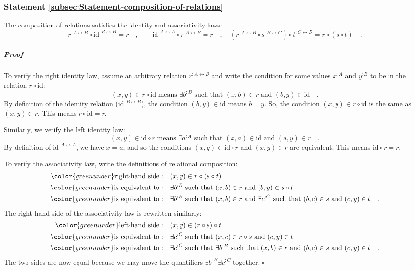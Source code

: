 \subsubsection{Statement \label{subsec:Statement-composition-of-relations}\ref{subsec:Statement-composition-of-relations}}

The composition of relations satisfies the identity and associativity
laws:
\[
r^{:A\leftrightarrow B}\circ\text{id}^{:B\leftrightarrow B}=r\quad,\quad\quad\text{id}^{:A\leftrightarrow A}\circ r^{:A\leftrightarrow B}=r\quad,\quad(r^{:A\leftrightarrow B}\circ s^{:B\leftrightarrow C})\circ t^{:C\leftrightarrow D}=r\circ(s\circ t)\quad.
\]


\subparagraph{Proof}

To verify the right identity law, assume an arbitrary relation $r^{:A\leftrightarrow B}$
and write the condition for some values $x^{:A}$ and $y^{:B}$ to
be in the relation $r\circ\text{id}$:
\[
(x,y)\in r\circ\text{id}\text{ means }\exists b^{:B}\text{ such that }(x,b)\in r\text{ and }(b,y)\in\text{id}\quad.
\]
By definition of the identity relation ($\text{id}^{:B\leftrightarrow B}$),
the condition $(b,y)\in\text{id}$ means $b=y$. So, the condition
$(x,y)\in r\circ\text{id}$ is the same as $(x,y)\in r$. This means
$r\circ\text{id}=r$.

Similarly, we verify the left identity law:
\[
(x,y)\in\text{id}\circ r\text{ means }\exists a^{:A}\text{ such that }(x,a)\in\text{id}\text{ and }(a,y)\in r\quad.
\]
By definition of $\text{id}^{:A\leftrightarrow A}$, we have $x=a$,
and so the conditions $(x,y)\in\text{id}\circ r$ and $(x,y)\in r$
are equivalent. This means $\text{id}\circ r=r$.

To verify the associativity law, write the definitions of relational
composition:
\begin{align*}
{\color{greenunder}\text{right-hand side}:}\quad & (x,y)\in r\circ(s\circ t)\\
{\color{greenunder}\text{is equivalent to}:}\quad & \exists b^{:B}\text{ such that }(x,b)\in r\text{ and }(b,y)\in s\circ t\\
{\color{greenunder}\text{is equivalent to}:}\quad & \exists b^{:B}\text{ such that }(x,b)\in r\text{ and }\exists c^{:C}\text{ such that }(b,c)\in s\text{ and }(c,y)\in t\quad.
\end{align*}
The right-hand side of the associativity law is rewritten similarly:
\begin{align*}
{\color{greenunder}\text{left-hand side}:}\quad & (x,y)\in(r\circ s)\circ t\\
{\color{greenunder}\text{is equivalent to}:}\quad & \exists c^{:C}\text{ such that }(x,c)\in r\circ s\text{ and }(c,y)\in t\\
{\color{greenunder}\text{is equivalent to}:}\quad & \exists c^{:C}\text{ such that }\exists b^{:B}\text{ such that }(x,b)\in r\text{ and }(b,c)\in s\text{ and }(c,y)\in t\quad.
\end{align*}
The two sides are now equal because we may move the quantifiers $\exists b^{:B}\exists c^{:C}$
together. $\square$

